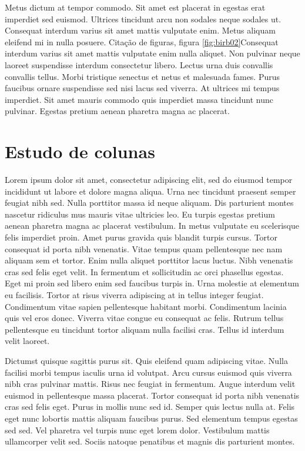 \documentclass[12pt]{article}
\begin{document}
			Metus dictum at tempor commodo. Sit amet est placerat in egestas erat imperdiet sed euismod. Ultrices tincidunt arcu non sodales neque sodales ut. Consequat interdum varius sit amet mattis vulputate enim. Metus aliquam eleifend mi in nulla posuere. Citação de figuras, figura \ref{fig:birb02}Consequat interdum varius sit amet mattis vulputate enim nulla aliquet. Non pulvinar neque laoreet suspendisse interdum consectetur libero. Lectus urna duis convallis convallis tellus. Morbi tristique senectus et netus et malesuada fames. Purus faucibus ornare suspendisse sed nisi lacus sed viverra. At ultrices mi tempus imperdiet. Sit amet mauris commodo quis imperdiet massa tincidunt nunc pulvinar. Egestas pretium aenean pharetra magna ac placerat.
	\newpage
	
	\section{Estudo de colunas}
		Lorem ipsum dolor sit amet, consectetur adipiscing elit, sed do eiusmod tempor incididunt ut labore et dolore magna aliqua. Urna nec tincidunt praesent semper feugiat nibh sed. Nulla porttitor massa id neque aliquam. Dis parturient montes nascetur ridiculus mus mauris vitae ultricies leo. Eu turpis egestas pretium aenean pharetra magna ac placerat vestibulum. In metus vulputate eu scelerisque felis imperdiet proin. Amet purus gravida quis blandit turpis cursus. Tortor consequat id porta nibh venenatis. Vitae tempus quam pellentesque nec nam aliquam sem et tortor. Enim nulla aliquet porttitor lacus luctus. Nibh venenatis cras sed felis eget velit. In fermentum et sollicitudin ac orci phasellus egestas. Eget mi proin sed libero enim sed faucibus turpis in. Urna molestie at elementum eu facilisis. Tortor at risus viverra adipiscing at in tellus integer feugiat. Condimentum vitae sapien pellentesque habitant morbi. Condimentum lacinia quis vel eros donec. Viverra vitae congue eu consequat ac felis. Rutrum tellus pellentesque eu tincidunt tortor aliquam nulla facilisi cras. Tellus id interdum velit laoreet.
		
		Dictumst quisque sagittis purus sit. Quis eleifend quam adipiscing vitae. Nulla facilisi morbi tempus iaculis urna id volutpat. Arcu cursus euismod quis viverra nibh cras pulvinar mattis. Risus nec feugiat in fermentum. Augue interdum velit euismod in pellentesque massa placerat. Tortor consequat id porta nibh venenatis cras sed felis eget. Purus in mollis nunc sed id. Semper quis lectus nulla at. Felis eget nunc lobortis mattis aliquam faucibus purus. Sed elementum tempus egestas sed sed. Vel pharetra vel turpis nunc eget lorem dolor. Vestibulum mattis ullamcorper velit sed. Sociis natoque penatibus et magnis dis parturient montes.
		
\end{document}
